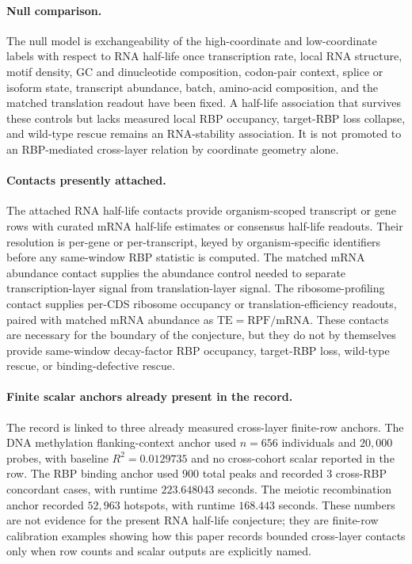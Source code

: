 \paragraph{Null comparison.}
The null model is exchangeability of the high-coordinate and low-coordinate labels with respect to RNA half-life once transcription rate, local RNA structure, motif density, GC and dinucleotide composition, codon-pair context, splice or isoform state, transcript abundance, batch, amino-acid composition, and the matched translation readout have been fixed.  A half-life association that survives these controls but lacks measured local RBP occupancy, target-RBP loss collapse, and wild-type rescue remains an RNA-stability association.  It is not promoted to an RBP-mediated cross-layer relation by coordinate geometry alone.

\paragraph{Contacts presently attached.}
The attached RNA half-life contacts provide organism-scoped transcript or gene rows with curated mRNA half-life estimates or consensus half-life readouts.  Their resolution is per-gene or per-transcript, keyed by organism-specific identifiers before any same-window RBP statistic is computed.  The matched mRNA abundance contact supplies the abundance control needed to separate transcription-layer signal from translation-layer signal.  The ribosome-profiling contact supplies per-CDS ribosome occupancy or translation-efficiency readouts, paired with matched mRNA abundance as $\mathrm{TE}=\mathrm{RPF}/\mathrm{mRNA}$.  These contacts are necessary for the boundary of the conjecture, but they do not by themselves provide same-window decay-factor RBP occupancy, target-RBP loss, wild-type rescue, or binding-defective rescue.

\paragraph{Finite scalar anchors already present in the record.}
The record is linked to three already measured cross-layer finite-row anchors.  The DNA methylation flanking-context anchor used $n=656$ individuals and $20{,}000$ probes, with baseline $R^2=0.0129735$ and no cross-cohort scalar reported in the row.  The RBP binding anchor used $900$ total peaks and recorded $3$ cross-RBP concordant cases, with runtime $223.648043$ seconds.  The meiotic recombination anchor recorded $52{,}963$ hotspots, with runtime $168.443$ seconds.  These numbers are not evidence for the present RNA half-life conjecture; they are finite-row calibration examples showing how this paper records bounded cross-layer contacts only when row counts and scalar outputs are explicitly named.

